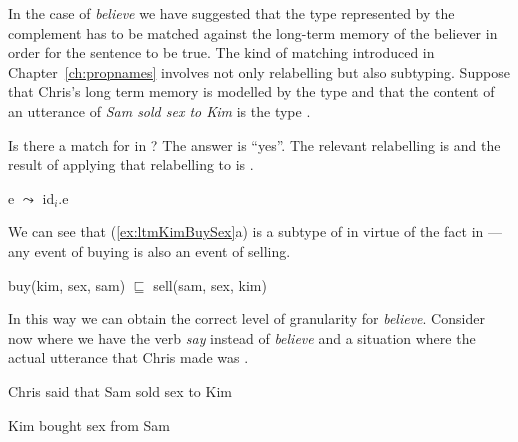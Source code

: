 In the case of
\textit{believe} we have suggested that the type represented by the
complement has to be matched against the long-term memory of the
believer in order for the sentence to be true.  The kind of matching
introduced in Chapter~\ref{ch:propnames} involves not only relabelling
but also subtyping.  Suppose that Chris's long term memory is modelled
by the type  and that the content of an utterance of
\textit{Sam sold sex to Kim} is the type .
\begin{ex} 
\begin{subex} 
 
\item {}
 
\item {} 
 
\end{subex} 
\label{ex:ltmKimBuySex}   
\end{ex} 
Is there a match for  in ?  The answer is
``yes''.  The relevant relabelling is  and the result of
applying that relabelling to  is .
\begin{ex} 
\begin{subex} 
 
\item e $\leadsto$ id$_i$.e 
 
\item {} 
 
\end{subex} 
   
\end{ex} 
We can see that (\ref{ex:ltmKimBuySex}a) is a subtype of  in
virtue of the fact in \nexteg{} --- any event of buying is also an
event of selling.
\begin{ex} 
buy(kim, sex, sam) $\sqsubseteq$ sell(sam, sex, kim) 
\end{ex} 
In this way we can obtain the correct level of granularity for
\textit{believe}.  Consider now  where we have the verb
\textit{say} instead of \textit{believe} and a situation where the
actual utterance that Chris made was .
\begin{ex} 
\begin{subex} 
 
\item Chris said that Sam sold sex to Kim 
 
\item Kim bought sex from Sam 
 
\end{subex} 
\label{ex:ChrisSaidSamSoldSex}
   
\end{ex} 
